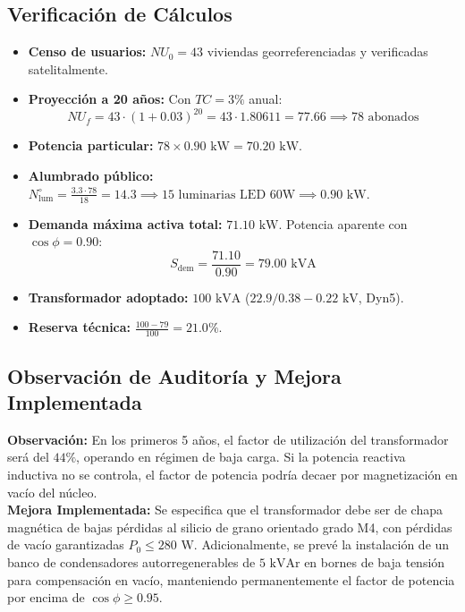 \documentclass[12pt,a4paper]{report}
\begin{document}
\subsection{Verificación de Cálculos}
\begin{itemize}
    \item \textbf{Censo de usuarios:} $NU_0 = 43\text{ viviendas}$ georreferenciadas y verificadas satelitalmente.
    \item \textbf{Proyección a 20 años:} Con $TC = 3\%$ anual:
    \begin{equation}
        NU_f = 43 \cdot (1 + 0.03)^{20} = 43 \cdot 1.80611 = 77.66 \implies 78\text{ abonados}
    \end{equation}
    \item \textbf{Potencia particular:} $78 \times 0.90\text{ kW} = 70.20\text{ kW}$.
    \item \textbf{Alumbrado público:} $N^\circ_{\text{lum}} = \frac{3.3 \cdot 78}{18} = 14.3 \implies 15\text{ luminarias LED 60W} \implies 0.90\text{ kW}$.
    \item \textbf{Demanda máxima activa total:} $71.10\text{ kW}$. Potencia aparente con $\cos\phi = 0.90$:
    \begin{equation}
        S_{\text{dem}} = \frac{71.10}{0.90} = 79.00\text{ kVA}
    \end{equation}
    \item \textbf{Transformador adoptado:} $100\text{ kVA}$ ($22.9 / 0.38 - 0.22\text{ kV}$, Dyn5).
    \item \textbf{Reserva técnica:} $\frac{100 - 79}{100} = 21.0\%$.
\end{itemize}

\subsection{Observación de Auditoría y Mejora Implementada}
\textbf{Observación:} En los primeros 5 años, el factor de utilización del transformador será del $44\%$, operando en régimen de baja carga. Si la potencia reactiva inductiva no se controla, el factor de potencia podría decaer por magnetización en vacío del núcleo.\\
\textbf{Mejora Implementada:} Se especifica que el transformador debe ser de chapa magnética de bajas pérdidas al silicio de grano orientado grado M4, con pérdidas de vacío garantizadas $P_0 \le 280\text{ W}$. Adicionalmente, se prevé la instalación de un banco de condensadores autorregenerables de $5\text{ kVAr}$ en bornes de baja tensión para compensación en vacío, manteniendo permanentemente el factor de potencia por encima de $\cos\phi \ge 0.95$.
\end{document}

